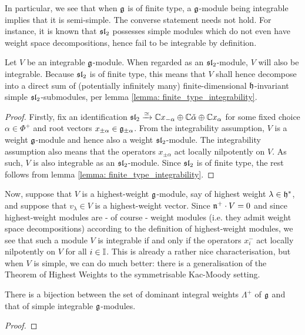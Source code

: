         In particular, we see that when $\mathfrak{g}$ is of finite type, a $\mathfrak{g}$-module being integrable implies that it is semi-simple. The converse statement needs not hold. For instance, it is known that $\sl_2$ possesses simple modules which do not even have weight space decompositions, hence fail to be integrable by definition.
        \begin{proposition}[$\sl_2$-integrability] \label{prop: sl2_integrability}
            Let $V$ be an integrable $\mathfrak{g}$-module. When regarded as an $\sl_2$-module, $V$ will also be integrable. Because $\sl_2$ is of finite type, this means that $V$ shall hence decompose into a direct sum of (potentially infinitely many) finite-dimensional $\mathfrak{h}$-invariant simple $\sl_2$-submodules, per lemma \ref{lemma: finite_type_integrability}.
        \end{proposition}
            \begin{proof}
                Firstly, fix an identification $\mathfrak{sl}_2 \xrightarrow[]{\simeq} \mathbb{C} x_{-\alpha} \oplus \mathbb{C} \check{\alpha} \oplus \mathbb{C} x_{\alpha}$ for some fixed choice $\alpha \in \Phi^+$ and root vectors $x_{\pm \alpha} \in \mathfrak{g}_{\pm \alpha}$. From the integrability assumption, $V$ is a weight $\mathfrak{g}$-module and hence also a weight $\sl_2$-module. The integrability assumption also means that the operators $x_{\pm \alpha}$ act locally nilpotently on $V$. As such, $V$ is also integrable as an $\sl_2$-module. Since $\sl_2$ is of finite type, the rest follows from lemma \ref{lemma: finite_type_integrability}.
            \end{proof}

        Now, suppose that $V$ is a highest-weight $\mathfrak{g}$-module, say of highest weight $\lambda \in \mathfrak{h}^*$, and suppose that $v_{\lambda} \in V$ is a highest-weight vector. Since $\mathfrak{n}^+ \cdot V = 0$ and since highest-weight modules are - of course - weight modules (i.e. they admit weight space decompositions) according to the definition of highest-weight modules, we see that such a module $V$ is integrable if and only if the operators $x_i^-$ act locally nilpotently on $V$ for all $i \in \mathbb{I}$. This is already a rather nice characterisation, but when $V$ is simple, we can do much better: there is a generalisation of the Theorem of Highest Weights to the symmetrisable Kac-Moody setting.
        \begin{theorem} \label{theorem: classification_of_simple_integrable_modules}
            \cite[Lemma 10.1]{kac_infinite_dimensional_lie_algebras} There is a bijection between the set of dominant integral weights $\Lambda^+$ of $\mathfrak{g}$ and that of simple integrable $\mathfrak{g}$-modules.
        \end{theorem}
            \begin{proof}
                
            \end{proof}

        